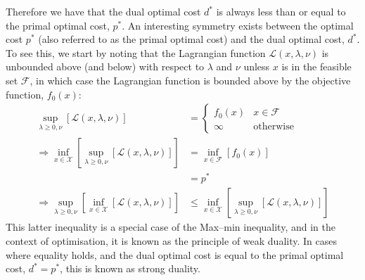 Therefore we have that the dual optimal cost $d^*$ is always less than or equal to the primal optimal cost, $p^*$. An interesting symmetry exists between the optimal cost $p^*$ (also referred to as the primal optimal cost) and the dual optimal cost, $d^*$. To see this, we start by noting that the Lagrangian function $\mathcal{L}(x, \lambda, \nu)$ is unbounded above (and below) with respect to $\lambda$ and $\nu $ unless $x$ is in the feasible set $\mathcal{F}$, in which case the Lagrangian function is bounded above by the objective function, $f_0(x)$:
\begin{align}
    \underset{\lambda \ge 0, \nu}{\sup}\left[ \mathcal{L}(x, \lambda, \nu) \right] &= \begin{cases}
        f_0(x) & x \in \mathcal{F} \\
        \infty & \text{otherwise}
    \end{cases} \\
    \Rightarrow \underset{x\in\mathcal{X}}{\inf}\left[\underset{\lambda \ge 0, \nu}{\sup}\left[\mathcal{L}(x, \lambda, \nu)\right]\right] &= \underset{x\in\mathcal{F}}{\inf}\left[f_0(x)\right] \\
    &= p^* \\
    \Rightarrow \underset{\lambda \ge 0, \nu}{\sup}\left[\underset{x\in\mathcal{X}}{\inf}\left[\mathcal{L}(x, \lambda, \nu)\right]\right] &\le \underset{x\in\mathcal{X}}{\inf}\left[\underset{\lambda \ge 0, \nu}{\sup}\left[\mathcal{L}(x, \lambda, \nu)\right]\right]
\end{align}
This latter inequality is a special case of the Max–min inequality, and in the context of optimisation, it is known as the principle of weak duality. In cases where equality holds, and the dual optimal cost is equal to the primal optimal cost, $d^* = p^*$, this is known as strong duality.
